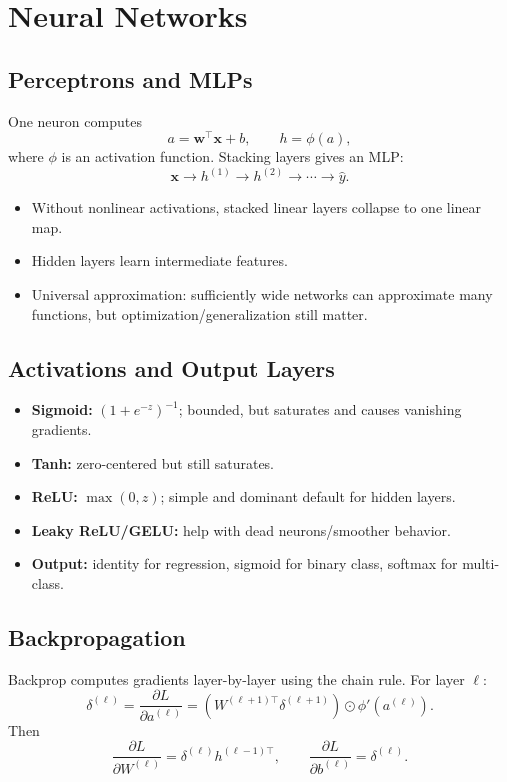 \documentclass[10pt,twocolumn]{article}
\newcommand{\x}{\mathbf{x}}
\newcommand{\w}{\mathbf{w}}
\begin{document}
\section{Neural Networks}
\subsection{Perceptrons and MLPs}
One neuron computes
\[
a = \w^\top\x+b,\qquad h=\phi(a),
\]
where $\phi$ is an activation function. Stacking layers gives an MLP:
\[
\x \to h^{(1)} \to h^{(2)} \to \cdots \to \hat y.
\]
\begin{itemize}
  \item Without nonlinear activations, stacked linear layers collapse to one linear map.
  \item Hidden layers learn intermediate features.
  \item Universal approximation: sufficiently wide networks can approximate many functions, but optimization/generalization still matter.
\end{itemize}

\subsection{Activations and Output Layers}
\begin{itemize}
  \item \textbf{Sigmoid:} $(1+e^{-z})^{-1}$; bounded, but saturates and causes vanishing gradients.
  \item \textbf{Tanh:} zero-centered but still saturates.
  \item \textbf{ReLU:} $\max(0,z)$; simple and dominant default for hidden layers.
  \item \textbf{Leaky ReLU/GELU:} help with dead neurons/smoother behavior.
  \item \textbf{Output:} identity for regression, sigmoid for binary class, softmax for multi-class.
\end{itemize}

\subsection{Backpropagation}
Backprop computes gradients layer-by-layer using the chain rule. For layer $\ell$:
\[
\delta^{(\ell)} = \frac{\partial L}{\partial a^{(\ell)}}
= \left(W^{(\ell+1)\top}\delta^{(\ell+1)}\right)\odot \phi'(a^{(\ell)}).
\]
Then
\[
\frac{\partial L}{\partial W^{(\ell)}} = \delta^{(\ell)} h^{(\ell-1)\top},
\qquad
\frac{\partial L}{\partial b^{(\ell)}} = \delta^{(\ell)}.
\]
\end{document}
